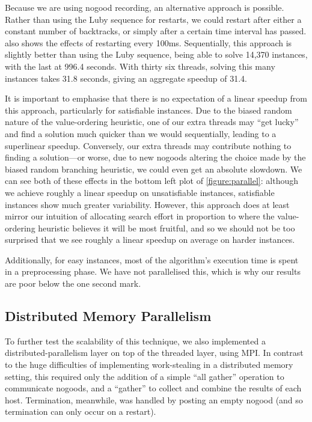 \documentclass[runningheads]{llncs}
\begin{document}
Because we are using nogood recording, an alternative approach is possible. Rather than using the
Luby sequence for restarts, we could restart after either a constant number of backtracks, or simply
after a certain time interval has passed.  also shows the effects of restarting
every 100ms. Sequentially, this approach is slightly better than using the Luby sequence, being able to
solve 14,370 instances, with the last at 996.4 seconds. With thirty six threads, solving this many
instances takes 31.8 seconds, giving an aggregate speedup of 31.4.

It is important to emphasise that there is no expectation of a linear speedup from this approach,
particularly for satisfiable instances. Due to the biased random nature of the value-ordering heuristic,
one of our extra threads may ``get lucky'' and find a solution much quicker than we would
sequentially, leading to a superlinear speedup. Conversely, our extra threads may contribute nothing to finding a
solution---or worse, due to new nogoods altering the choice made by the biased random branching heuristic,
we could even get an absolute slowdown. We can see both of these effects in the bottom left plot of
\cref{figure:parallel}: although we achieve roughly a linear speedup on unsatisfiable instances,
satisfiable instances show much greater variability. However, this approach does at least mirror our intuition of
allocating search effort in proportion to where the value-ordering heuristic believes it will be
most fruitful, and so we should not be too surprised that we see roughly a linear speedup on average
on harder instances.

Additionally, for easy instances, most of the algorithm's execution time is spent in a preprocessing
phase. We have not parallelised this, which is why our results are poor below the one second mark.

\subsection{Distributed Memory Parallelism}

To further test the scalability of this technique, we also implemented a distributed-parallelism
layer on top of the threaded layer, using MPI. In contrast to the huge difficulties of implementing
work-stealing in a distributed memory setting, this required only the addition of a simple ``all
gather'' operation to communicate nogoods, and a ``gather'' to collect and combine the results of
each host. Termination, meanwhile, was handled by posting an empty nogood (and so termination can
only occur on a restart).
\end{document}
